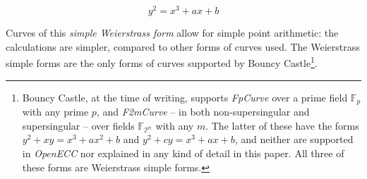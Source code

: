 \begin{equation}
	y^2 = x^3 + ax + b
\end{equation}

Curves of this \emph{simple Weierstrass form} allow for simple point arithmetic: the
calculations are simpler, compared to other forms of curves used. The Weierstrass simple forms are
the only forms of curves supported by Bouncy Castle\footnote{Bouncy Castle, at the time of writing,
supports \emph{FpCurve} over a prime field \(\mathbb{F}_p\) with any prime \(p\), and \emph{F2mCurve}
-- in both non-supersingular and supersingular -- over fields \(\mathbb{F_{2^m}}\) with any \(m\).
The latter of these have the forms \(y^2 + xy = x^3 + ax^2 + b\) and
\(y^2 + cy = x^3 + ax + b\), and neither are supported in \emph{OpenECC} nor explained in any kind
of detail in this paper. All three of these forms are Weierstrass simple forms.}.